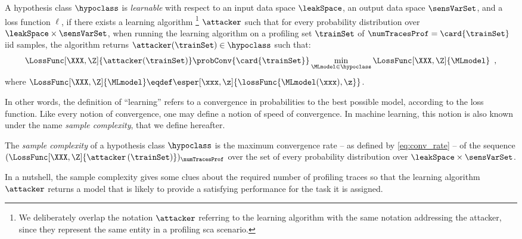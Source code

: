 \begin{definition}
	\label{def:learnability}
	A hypothesis class \(\hypoclass\) is \emph{learnable} with respect to an input data space \(\leakSpace\), an output data space \(\sensVarSet\), and a loss function \(\ell\), if there exists a learning algorithm%
	\footnote{
		We deliberately overlap the notation \(\attacker\) referring to the learning algorithm with the same notation addressing the attacker, since they represent the same entity in a profiling \gls{sca} scenario.
	}
	\(\attacker\) such that for every probability distribution over \(\leakSpace \times \sensVarSet\), when running the learning algorithm on a profiling set \(\trainSet\) of \(\numTracesProf = \card{\trainSet}\) \gls{iid} samples, the algorithm returns \(\attacker(\trainSet) \in \hypoclass\) such that:
	\begin{equation}
		\LossFunc[\XXX, \Z]{\attacker(\trainSet)} \probConv{\card{\trainSet}} \min_{\MLmodel \in \hypoclass} \LossFunc[\XXX, \Z]{\MLmodel} \enspace,
	\end{equation}
	where \(\LossFunc[\XXX, \Z]{\MLmodel} \eqdef \esper[\xxx, \z]{\lossFunc{\MLmodel(\xxx), \z}}\).
\end{definition}
In other words, the definition of ``learning'' refers to a convergence in probabilities to the best possible model, according to the loss function.
Like every notion of convergence, one may define a notion of speed of convergence.
In machine learning, this notion is also known under the name \emph{sample complexity}, that we define hereafter.
\begin{definition}
	The \emph{sample complexity} of a hypothesis class \(\hypoclass\) is the maximum convergence rate -- as defined by \autoref{eq:conv_rate} -- of the sequence \((\LossFunc[\XXX, \Z]{\attacker \left(\trainSet\right)})_{\numTracesProf}\) over the set of every probability distribution over \(\leakSpace \times \sensVarSet\).
	\label{def:sample_complexity}
\end{definition}
In a nutshell, the sample complexity gives some clues about the required number of profiling traces so that the learning algorithm \(\attacker\) returns a model that is likely to provide a satisfying performance for the task it is assigned.


